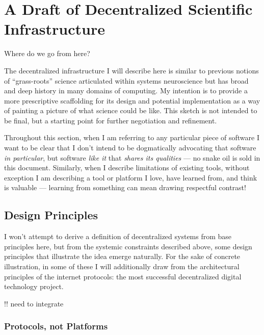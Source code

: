 \documentclass[10pt]{article}
\begin{document}
\hypertarget{a-draft-of-decentralized-scientific-infrastructure}{%
\section{A Draft of Decentralized Scientific
Infrastructure}\label{a-draft-of-decentralized-scientific-infrastructure}}


\begin{multicols}{2}
 Where do we go from here?

The decentralized infrastructure I will describe here is similar to
previous notions of ``grass-roots'' science articulated within systems
neuroscience \cite{mainenBetterWayCrack2016}  but has broad and
deep history in many domains of computing. My intention is to provide a
more prescriptive scaffolding for its design and potential
implementation as a way of painting a picture of what science could be
like. This sketch is not intended to be final, but a starting point for
further negotiation and refinement.

Throughout this section, when I am referring to any particular piece of
software I want to be clear that I don't intend to be dogmatically
advocating that software \emph{in particular}, but software \emph{like
it} that \emph{shares its qualities} --- no snake oil is sold in this
document. Similarly, when I describe limitations of existing tools,
without exception I am describing a tool or platform I love, have
learned from, and think is valuable --- learning from something can mean
drawing respectful contrast!

\hypertarget{design-principles}{%
\subsection{Design Principles}\label{design-principles}}

I won't attempt to derive a definition of decentralized systems from
base principles here, but from the systemic constraints described above,
some design principles that illustrate the idea emerge naturally. For
the sake of concrete illustration, in some of these I will additionally
draw from the architectural principles of the internet protocols: the
most successful decentralized digital technology project.

!! need to integrate \cite{larsenPoliticalNatureTCP2012} 

\hypertarget{protocols-not-platforms}{%
\subsubsection{Protocols, not Platforms}\label{protocols-not-platforms}}


\end{multicols}
\end{document}
